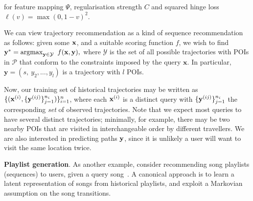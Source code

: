 for
feature mapping $\Psi$,
regularisation strength $C$ %
and squared hinge loss $\ell( v ) = \max( 0, 1 - v )^2$.

We can view trajectory recommendation as a kind of sequence recommendation as follows:
given some $\mathbf{x}$, and a suitable scoring function $f$, we wish to find
$\mathbf{y}^* = \operatorname*{argmax}_{\mathbf{y} \in \mathcal{Y}}~f(\mathbf{x}, \mathbf{y}),$ 
where $\mathcal{Y}$ is the set of all possible trajectories with POIs in $\mathcal{P}$ that conform to the constraints imposed by the query $\mathbf{x}$.
In particular,
$\mathbf{y} = (s,~ y_2, \dots, y_l)$ is a trajectory with $l$ POIs. %

Now, our training set of historical trajectories may be written as
$\{ ( \mathbf{x}^{({i})}, \{ \mathbf{y}^{({ij})} \}_{j=1}^{n_i} ) \}_{i=1}^{n}$,
where each $\mathbf{x}^{({i})}$ is a distinct query
with $\{ \mathbf{y}^{({ij})} \}_{j=1}^{n_i}$ the corresponding \emph{set} of observed trajectories.
Note that we expect most queries to have several distinct trajectories;
minimally,
for example,
there may be two nearby POIs that are visited in interchangeable order by different travellers.
We are also interested in predicting paths $\mathbf{y}$, since it is unlikely a user will want to visit the same location twice.


%
\textbf{Playlist generation}.
As another example, consider recommending song playlists (\ie sequences) to users, given a query song~\citep{McFee:2011,chen2012playlist,hidasi2015session,choi2016towards}.
A canonical approach is to
learn a latent representation of songs from historical playlists,
and exploit a Markovian assumption on the song transitions.


